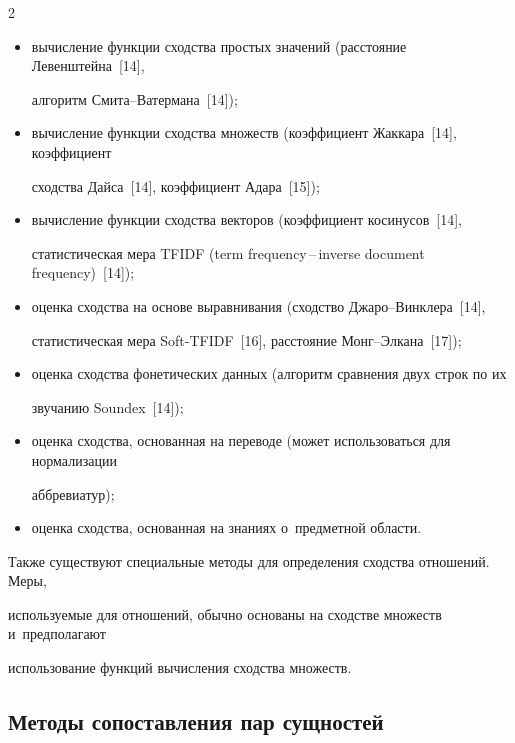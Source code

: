 \begin{multicols}{2}
\begin{itemize}
\item вычисление функции сходства простых значений (расстояние Левенштейна~[14],

алгоритм Сми\-та--Ва\-тер\-ма\-на~[14]);\\[-13pt]

\item вычисление функции сходства множеств (коэффициент Жаккара~[14], коэффициент

сходства Дайса~[14], коэффициент Адара~[15]);\\[-13pt]

\item вычисление функции сходства векторов (коэффициент косинусов~[14],

статистическая мера TFIDF (term frequency\,--\,inverse document frequency)~[14]);\\[-13pt]

\item оценка сходства на основе выравнивания (сходство Джа\-ро--Винк\-ле\-ра~[14],

статистическая мера Soft-TFIDF~[16], расстояние Монг--Эл\-ка\-на~[17]);\\[-13pt]

\item оценка сходства фонетических данных (алгоритм сравнения двух строк по их

звучанию Soundex~[14]);\\[-13pt]

\item оценка сходства, основанная на переводе (может использоваться для нормализации

аббревиатур);\\[-13pt]

\item оценка сходства, основанная на знаниях о~предметной области.

\end{itemize}



  Также существуют специальные методы для определения сходства отношений. Меры,

используемые для отношений, обычно основаны на сходстве множеств и~предполагают

использование функций вычисления сходства множеств.



\vspace*{-3pt}



  \subsection{Методы сопоставления пар сущностей}




\end{multicols}
